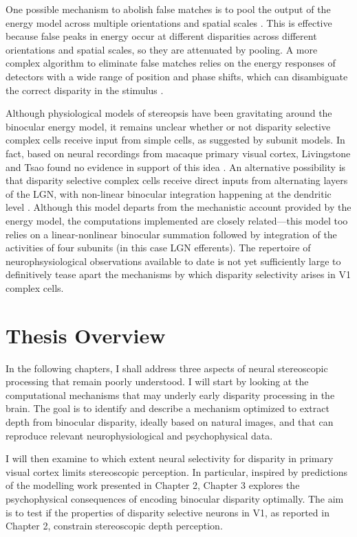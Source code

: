 One possible mechanism to abolish false matches is to pool the output of the energy model across multiple orientations and spatial scales \cite{Fleet:1996tq}. This is effective because false peaks in energy occur at different disparities across different orientations and spatial scales, so they are attenuated by pooling. A more complex algorithm to eliminate false matches relies on the energy responses of detectors with a wide range of position and phase shifts, which can disambiguate the correct disparity in the stimulus \cite{Read:2007nx}.

Although physiological models of stereopsis have been gravitating around the binocular energy model, it remains unclear whether or not disparity selective complex cells receive input from simple cells, as suggested by subunit models. In fact, based on neural recordings from macaque primary visual cortex, Livingstone and Tsao found no evidence in support of this idea \cite{Livingstone:1999mp}. An alternative possibility is that disparity selective complex cells receive direct inputs from alternating layers of the LGN, with non-linear binocular integration happening at the dendritic level \cite{Archie:2000fk}. Although this model departs from the mechanistic account provided by the energy model, the computations implemented are closely related---this model too relies on a linear-nonlinear binocular summation followed by integration of the activities of four subunits (in this case LGN efferents). The repertoire of neurophsysiological observations available to date is not yet sufficiently large to definitively tease apart the mechanisms by which disparity selectivity arises in V1 complex cells.


\section{Thesis Overview} 

In the following chapters, I shall address three aspects of neural stereoscopic processing that remain poorly understood. I will start by looking at the computational mechanisms that may underly early disparity processing in the brain. The goal is to identify and describe a mechanism optimized to extract depth from binocular disparity, ideally based on natural images, and that can reproduce relevant neurophysiological and psychophysical data.

I will then examine to which extent neural selectivity for disparity in primary visual cortex limits stereoscopic perception. In particular, inspired by predictions of the modelling work presented in Chapter 2, Chapter 3 explores the psychophysical consequences of encoding binocular disparity optimally. The aim is to test if the properties of disparity selective neurons in V1, as reported in Chapter 2, constrain stereoscopic depth perception.

